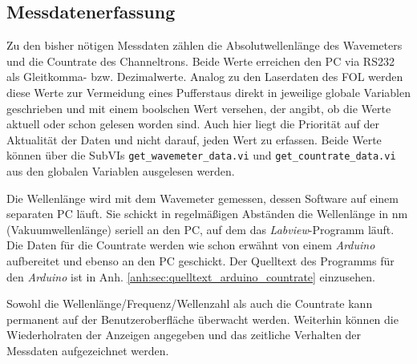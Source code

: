 \subsection{Messdatenerfassung}\label{subsec:messdatenerfassung}
Zu den bisher nötigen Messdaten zählen die Absolutwellenlänge des Wavemeters und
die Countrate des Channeltrons. Beide Werte erreichen den PC via RS232 als
Gleitkomma- bzw. Dezimalwerte. Analog zu den Laserdaten des FOL werden diese
Werte zur Vermeidung eines Pufferstaus direkt in jeweilige globale Variablen
geschrieben und mit einem boolschen Wert versehen, der angibt, ob die Werte
aktuell oder schon gelesen worden sind. Auch hier liegt die Priorität auf der
Aktualität der Daten und nicht darauf, jeden Wert zu erfassen. Beide Werte
können über die SubVIs \lstinline|get_wavemeter_data.vi| und
\lstinline|get_countrate_data.vi| aus den globalen Variablen ausgelesen
werden.\par
Die Wellenlänge wird mit dem Wavemeter gemessen, dessen Software auf einem
separaten PC läuft. Sie schickt in regelmäßigen Abständen die Wellenlänge in nm
(Vakuumwellenlänge) seriell an den PC, auf dem das \textit{Labview}-Programm läuft. Die Daten für die Countrate werden wie schon
erwähnt von einem \textit{Arduino} aufbereitet und ebenso an
den PC geschickt. Der Quelltext des Programms für den \textit{Arduino} ist in Anh.
\ref{anh:sec:quelltext_arduino_countrate} einzusehen.\par
Sowohl die Wellenlänge/Frequenz/Wellenzahl als auch die Countrate kann
permanent auf der Benutzeroberfläche überwacht werden. Weiterhin können die
Wiederholraten der Anzeigen angegeben und das zeitliche Verhalten der Messdaten
aufgezeichnet werden.


